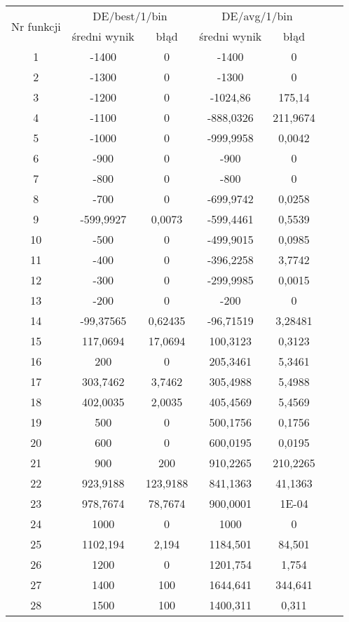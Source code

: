 \documentclass[a4paper,12pt]{article}
\theoremstyle{definition}
\begin{document}
\begin{table}[H]
\begin{tabular}{|c|c|c|c|c|c|c|}
	\hline
	\multirow{2}{*}{Nr funkcji} & \multicolumn{2}{c|}{DE/best/1/bin} & \multicolumn{2}{c|}{DE/avg/1/bin}\\
	\cline{2-5}
	& średni wynik & błąd & średni wynik & błąd\\\hline
	1     & -1400 & 0     & -1400 & 0 \\\hline
    2     & -1300 & 0     & -1300 & 0 \\\hline
    3     & -1200 & 0     & -1024,86 & 175,14 \\\hline
    4     & -1100 & 0     & -888,0326 & 211,9674 \\\hline
    5     & -1000 & 0     & -999,9958 & 0,0042 \\\hline
    6     & -900  & 0     & -900  & 0 \\\hline
    7     & -800  & 0     & -800  & 0 \\\hline
    8     & -700  & 0     & -699,9742 & 0,0258 \\\hline
    9     & -599,9927 & 0,0073 & -599,4461 & 0,5539 \\\hline
    10    & -500  & 0     & -499,9015 & 0,0985 \\\hline
    11    & -400  & 0     & -396,2258 & 3,7742 \\\hline
    12    & -300  & 0     & -299,9985 & 0,0015 \\\hline
    13    & -200  & 0     & -200  & 0 \\\hline
    14    & -99,37565 & 0,62435 & -96,71519 & 3,28481 \\\hline
    15    & 117,0694 & 17,0694 & 100,3123 & 0,3123 \\\hline
    16    & 200   & 0     & 205,3461 & 5,3461 \\\hline
    17    & 303,7462 & 3,7462 & 305,4988 & 5,4988 \\\hline
    18    & 402,0035 & 2,0035 & 405,4569 & 5,4569 \\\hline
    19    & 500   & 0     & 500,1756 & 0,1756 \\\hline
    20    & 600   & 0     & 600,0195 & 0,0195 \\\hline
    21    & 900   & 200   & 910,2265 & 210,2265 \\\hline
    22    & 923,9188 & 123,9188 & 841,1363 & 41,1363 \\\hline
    23    & 978,7674 & 78,7674 & 900,0001 & 1E-04 \\\hline
    24    & 1000  & 0     & 1000  & 0 \\\hline
    25    & 1102,194 & 2,194 & 1184,501 & 84,501 \\\hline
    26    & 1200  & 0     & 1201,754 & 1,754 \\\hline
    27    & 1400  & 100   & 1644,641 & 344,641 \\\hline
    28    & 1500  & 100   & 1400,311 & 0,311 \\\hline
\end{tabular}	
\end{table}
\end{document}

